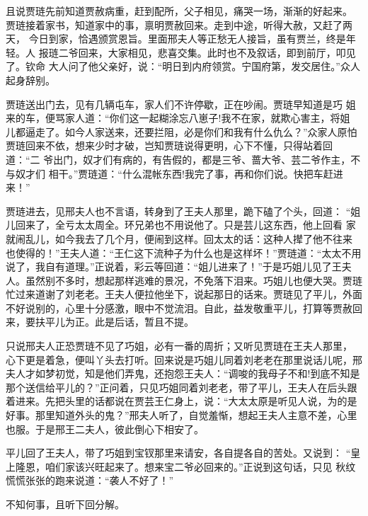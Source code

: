 且说贾琏先前知道贾赦病重，赶到配所，父子相见，痛哭一场，渐渐的好起来。
贾琏接着家书，知道家中的事，禀明贾赦回来。走到中途，听得大赦，又赶了两天，
今日到家，恰遇颁赏恩旨。里面邢夫人等正愁无人接旨，虽有贾兰，终是年轻。人
报琏二爷回来，大家相见，悲喜交集。此时也不及叙话，即到前厅，叩见了。钦命
大人问了他父亲好，说：“明日到内府领赏。宁国府第，发交居住。”众人起身辞别。

贾琏送出门去，见有几辆屯车，家人们不许停歇，正在吵闹。贾琏早知道是巧
姐来的车，便骂家人道：“你们这一起糊涂忘八崽子!我不在家，就欺心害主，将姐
儿都逼走了。如今人家送来，还要拦阻，必是你们和我有什么仇么？”众家人原怕
贾琏回来不依，想来少时才破，岂知贾琏说得更明，心下不懂，只得站着回道：“二
爷出门，奴才们有病的，有告假的，都是三爷、蔷大爷、芸二爷作主，不与奴才们
相干。”贾琏道：“什么混帐东西!我完了事，再和你们说。快把车赶进来！”

贾琏进去，见邢夫人也不言语，转身到了王夫人那里，跪下磕了个头，回道：
“姐儿回来了，全亏太太周全。环兄弟也不用说他了。只是芸儿这东西，他上回看
家就闹乱儿，如今我去了几个月，便闹到这样。回太太的话：这种人撵了他不往来
也使得的！”王夫人道：“王仁这下流种子为什么也是这样坏！”贾琏道：“太太不用
说了，我自有道理。”正说着，彩云等回道：“姐儿进来了！”于是巧姐儿见了王夫
人。虽然别不多时，想起那样逃难的景况，不免落下泪来。巧姐儿也便大哭。贾琏
忙过来道谢了刘老老。王夫人便拉他坐下，说起那日的话来。贾琏见了平儿，外面
不好说别的，心里十分感激，眼中不觉流泪。自此，益发敬重平儿，打算等贾赦回
来，要扶平儿为正。此是后话，暂且不提。

只说邢夫人正恐贾琏不见了巧姐，必有一番的周折；又听见贾琏在王夫人那里，
心下更是着急，便叫丫头去打听。回来说是巧姐儿同着刘老老在那里说话儿呢，邢
夫人才如梦初觉，知是他们弄鬼，还抱怨王夫人：“调唆的我母子不和!到底不知是
那个送信给平儿的？”正问着，只见巧姐同着刘老老，带了平儿，王夫人在后头跟
着进来。先把头里的话都说在贾芸王仁身上，说：“大太太原是听见人说，为的是
好事。那里知道外头的鬼？”邢夫人听了，自觉羞惭，想起王夫人主意不差，心里
也服。于是邢王二夫人，彼此倒心下相安了。

平儿回了王夫人，带了巧姐到宝钗那里来请安，各自提各自的苦处。又说到：
“皇上隆恩，咱们家该兴旺起来了。想来宝二爷必回来的。”正说到这句话，只见
秋纹慌慌张张的跑来说道：“袭人不好了！”

不知何事，且听下回分解。